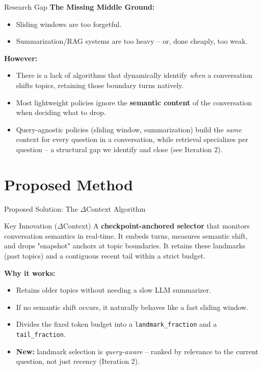 \documentclass[aspectratio=169]{beamer}
\begin{document}
\begin{frame}{Research Gap}
    \textbf{The Missing Middle Ground:}
    \begin{itemize}
        \item Sliding windows are too forgetful.
        \item Summarization/RAG systems are too heavy -- or, done cheaply, too weak.
    \end{itemize}

    \vspace{0.3cm}
    \textbf{However:}
    \begin{itemize}
        \item[$\times$] There is a lack of algorithms that dynamically identify \textit{when} a conversation shifts topics, retaining those boundary turns natively.
        \item[$\times$] Most lightweight policies ignore the \textbf{semantic content} of the conversation when deciding what to drop.
        \item[$\times$] Query-agnostic policies (sliding window, summarization) build the \emph{same} context for every question in a conversation, while retrieval specializes per question -- a structural gap we identify and close (see Iteration 2).
    \end{itemize}
\end{frame}

\section{Proposed Method}

\begin{frame}{Proposed Solution: The $\Delta$Context Algorithm}
    \begin{alertblock}{Key Innovation ($\Delta$Context)}
        A \textbf{checkpoint-anchored selector} that monitors conversation semantics in real-time. It embeds turns, measures semantic shift, and drops "snapshot" anchors at topic boundaries. It retains these landmarks (past topics) and a contiguous recent tail within a strict budget.
    \end{alertblock}

    \vspace{0.3cm}
    \textbf{Why it works:}
    \begin{itemize}
        \item Retains older topics without needing a slow LLM summarizer.
        \item If no semantic shift occurs, it naturally behaves like a fast sliding window.
        \item Divides the fixed token budget into a \texttt{landmark\_fraction} and a \texttt{tail\_fraction}.
        \item \textbf{New:} landmark selection is \emph{query-aware} -- ranked by relevance to the current question, not just recency (Iteration 2).
    \end{itemize}
\end{frame}
\end{document}
